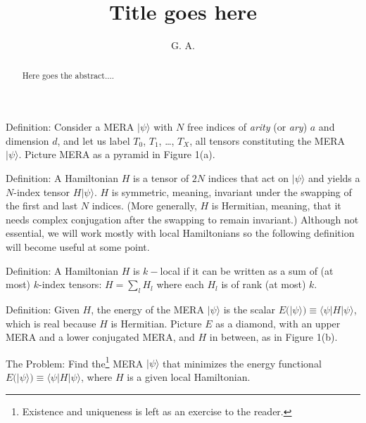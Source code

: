 \documentclass[twocolumn,showpacs,preprintnumbers,amsmath,amssymb,prb]{revtex4}
\begin{document}
\title{Title goes here}
\author{G. A.}

\begin{abstract}
Here goes the abstract....
\end{abstract}

\maketitle

Definition: Consider a MERA $|\psi\rangle$ with $N$ free indices of
\emph{arity} (or \emph{ary}) $a$ and dimension $d$, and let us label $T_0$, $T_1$, \ldots, $T_X$, 
 all tensors constituting the MERA
$|\psi\rangle$. Picture MERA as a pyramid in Figure 1(a).

Definition: A Hamiltonian $H$ is a tensor of $2N$ indices that act on $|\psi\rangle$ and yields
a $N$-index tensor $H|\psi\rangle$. $H$ is symmetric, meaning, invariant under the swapping of the first
and last $N$ indices. (More generally, $H$ is Hermitian, meaning, that it needs complex conjugation
after the swapping to remain invariant.) 
Although not essential, we will work mostly with local Hamiltonians so the following definition will
become useful at some point.

Definition: A Hamiltonian $H$ is $k-$local if it can be written as a sum of (at most) $k$-index tensors:
$H=\sum_l H_l$ where each $H_l$ is of rank (at most) $k$.

Definition: Given $H$, the energy of the MERA $|\psi\rangle$ is the scalar $E(|\psi\rangle)\equiv \langle \psi | H |\psi\rangle$,
which is real because $H$ is Hermitian. Picture $E$ as a diamond, with an upper MERA and a lower conjugated MERA, and
$H$ in between, as in Figure 1(b).

The Problem: Find the\footnote{Existence and uniqueness is left as an exercise to the reader.} 
MERA $|\psi\rangle$ that minimizes the energy functional
$E(|\psi\rangle)\equiv \langle \psi | H |\psi\rangle$, where $H$ is a given local Hamiltonian.
\end{document}
